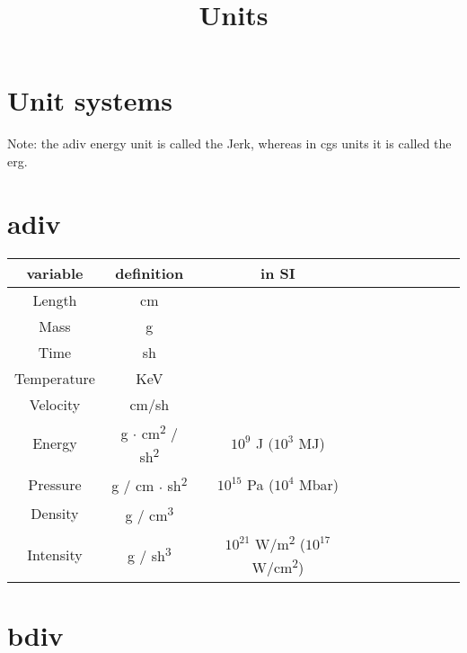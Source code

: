 \documentclass[11pt]{article}
\title{Units}
\begin{document}
\maketitle

\setlength{\cellspacetoplimit}{3pt}
\setlength{\cellspacebottomlimit}{3pt}

\section{Unit systems}
Note: the adiv energy unit is called the Jerk, whereas in cgs units it is called the erg.
\section{adiv}

\begin{center}
    \begin{tabular}{|Sc|Sc|Sc|Sc|Sc|}
        \hline
        variable & definition & in SI \\
        \hline 
        Length & cm & \\
        \hline
        Mass & g & \\
        \hline
        Time & sh & \\
        \hline
        Temperature & KeV & \\
        \hline
        Velocity & cm/sh & \\
        \hline
        Energy & g \( \cdot \) cm\textsuperscript{2} / sh\textsuperscript{2} & $10^9$ J  $(10^3$ MJ)\\
        \hline 
        Pressure & g / cm \( \cdot \) sh\textsuperscript{2} & $10^{15}$ Pa ($10^4$ Mbar) \\
        \hline
        Density & g / cm\textsuperscript{3} & \\
        \hline 
        Intensity & g / sh\textsuperscript{3} & $10^{21}$ W/m\textsuperscript{2} ($10^{17}$ W/cm\textsuperscript{2}) \\
        \hline
    \end{tabular}
\end{center}

\section{bdiv}
\end{document}
